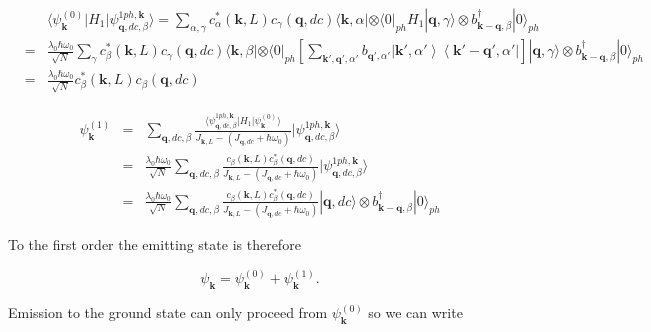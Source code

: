 \documentclass[pt12]{article}
\newcommand{\beq}{\begin{equation}}
\newcommand{\eeq}{\end{equation}}
\newcommand{\bea}{\begin{eqnarray}}
\newcommand{\eea}{\end{eqnarray}}
\newcommand{\bfk}{\mathbf{k}}
\newcommand{\bfq}{\mathbf{q}}
\begin{document}
\bea &&\langle \psi_{\bfk}^{(0)} | H_1 |
\psi_{\bfq,dc,\beta}^{1ph,\bfk} \rangle = \sum_{\alpha,\gamma}
c^*_{\alpha}(\bfk,L) c_{\gamma}(\bfq,dc) \langle
\bfk,\alpha|\otimes\langle 0|_{ph} H_1  | \bfq,\gamma \rangle\otimes
b^\dagger_{\bfk-\bfq,\beta}|0\rangle_{ph} \\
&=& \frac{\lambda_0\hbar\omega_0}{\sqrt{N}}\sum_{\gamma}
c^*_{\beta}(\bfk,L) c_{\gamma}(\bfq,dc) \langle
\bfk,\beta|\otimes\langle 0|_{ph} \left[
\sum_{\bfk',\bfq',\alpha'}b_{\bfq',\alpha'}\left| \bfk',\alpha'
\right\rangle \left\langle \bfk'-\bfq',\alpha' \right|\right]  |
\bfq,\gamma \rangle\otimes b^\dagger_{\bfk-\bfq,\beta}|0\rangle_{ph}
\\
&=& \frac{\lambda_0\hbar\omega_0}{\sqrt{N}} c^*_{\beta}(\bfk,L)
c_{\beta}(\bfq,dc)
 \eea

\bea \psi_{\bfk}^{(1)}&=&\sum_{\bfq,dc,\beta} \frac{\langle
\psi_{\bfq,dc,\beta}^{1ph,\bfk}  | H_1 | \psi_{\bfk}^{(0)}
\rangle}{J_{\bfk,L}-(J_{\bfq,dc}+\hbar\omega_0)} |
\psi_{\bfq,dc,\beta}^{1ph,\bfk} \rangle \\
&=&\frac{\lambda_0\hbar\omega_0}{\sqrt{N}} \sum_{\bfq,dc,\beta}
\frac{c_{\beta}(\bfk,L)
c^*_{\beta}(\bfq,dc)}{J_{\bfk,L}-(J_{\bfq,dc}+\hbar\omega_0)} |
\psi_{\bfq,dc,\beta}^{1ph,\bfk} \rangle\\
&=&\frac{\lambda_0\hbar\omega_0}{\sqrt{N}} \sum_{\bfq,dc,\beta}
\frac{c_{\beta}(\bfk,L)
c^*_{\beta}(\bfq,dc)}{J_{\bfk,L}-(J_{\bfq,dc}+\hbar\omega_0)}
|\bfq,dc\rangle\otimes b^\dagger_{\bfk-\bfq,\beta}|0\rangle_{ph}
\eea

To the first order the emitting state is therefore

\beq \psi_{\bfk}=\psi_{\bfk}^{(0)}+\psi_{\bfk}^{(1)}. \eeq

Emission to the ground state can only proceed from
$\psi_{\bfk}^{(0)}$ so we can write
\end{document}
